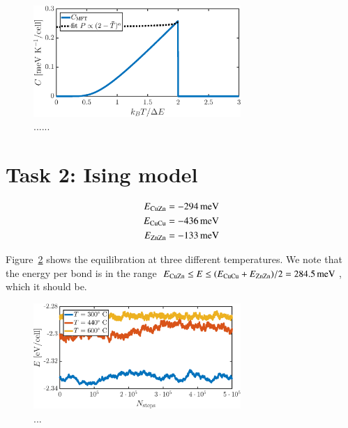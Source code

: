 \begin{figure}[!ht]
\begin{center}
  \includegraphics[width=0.7\textwidth]{../figures/C_MFT} 
  \caption{......}
  \label{fig:T1:C}
\end{center}
\end{figure}

\section*{Task 2: Ising model}
\begin{align}
E_{\rm CuZn} &= \unit[-294]{meV} \\
E_{\rm CuCu} &= \unit[-436]{meV} \\
E_{\rm ZnZn} &= \unit[-133]{meV} \\
\end{align}

Figure~\ref{fig:T2:equil} shows the equilibration at three different temperatures. We note that the energy per bond is in the range $E_{\rm CuZn} \leq E \leq (E_{\rm CuCu} + E_{\rm ZnZn})/2 = \unit[284.5]{meV}$, which it should be. 

\begin{figure}[!ht]
\begin{center}
  \includegraphics[width=0.7\textwidth]{../figures/equilibration} 
  \caption{... }
  \label{fig:T2:equil}
\end{center}
\end{figure}

